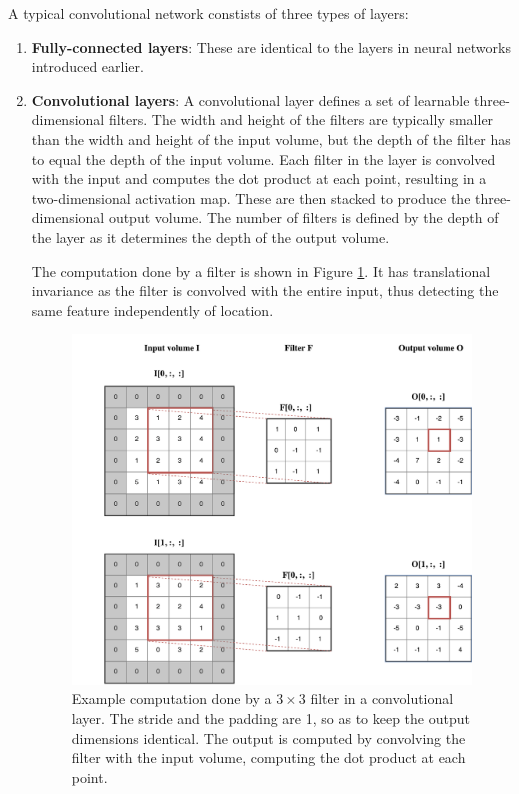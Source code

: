 \documentclass[12pt,a4paper,twoside,openright]{report}
\begin{document}
A typical convolutional network constists of three types of layers:
\begin{enumerate}
	\item \textbf{Fully-connected layers}: These are identical to the layers in  neural networks introduced earlier.
	\item \textbf{Convolutional layers}: A convolutional layer defines a set of learnable three-dimensional filters. The width and height of the filters are typically smaller than the width and height of the input volume, but the depth of the filter has to equal the depth of the input volume. Each filter in the layer is convolved with the input and computes the dot product at each point, resulting in a two-dimensional activation map. These are then stacked to produce the three-dimensional output volume. The number of filters is defined by the depth of the layer as it determines the depth of the output volume.
	
	The computation done by a filter is shown in Figure \ref{fig:conv_example}. It has translational invariance as the filter is convolved with the entire input, thus detecting the same feature independently of location.  
	\begin{figure}
		\centering
		\includegraphics[scale=0.55]{conv_example2}
		\caption[Example computation done by a $3 \times 3$ filter in a convolutional layer.]{Example computation done by a $3 \times 3$ filter in a convolutional layer. The stride and the padding are 1, so as to keep the output dimensions identical. The output is computed by convolving the filter with the input volume, computing the dot product at each point.}
		\label{fig:conv_example}
	\end{figure}


\end{enumerate}
\end{document}
